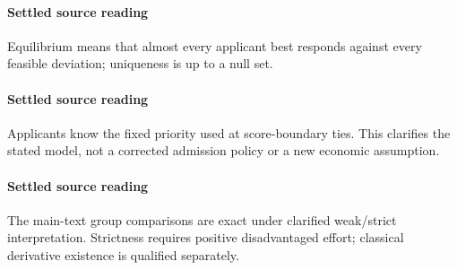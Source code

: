 \documentclass[10pt]{article}
\begin{document}
\paragraph{Settled source reading}
\begin{sloppypar}
Equilibrium means that almost every applicant best responds against every feasible deviation;\allowbreak{} uniqueness is up to a null set.\allowbreak{}
\end{sloppypar}
\paragraph{Settled source reading}
\begin{sloppypar}
Applicants know the fixed priority used at score-\allowbreak{}boundary ties.\allowbreak{} This clarifies the stated model, not a corrected admission policy or a new economic assumption.\allowbreak{}
\end{sloppypar}
\paragraph{Settled source reading}
\begin{sloppypar}
The main-\allowbreak{}text group comparisons are exact under clarified weak/\allowbreak{}strict interpretation.\allowbreak{} Strictness requires positive disadvantaged effort;\allowbreak{} classical derivative existence is qualified separately.\allowbreak{}
\end{sloppypar}
\end{document}
